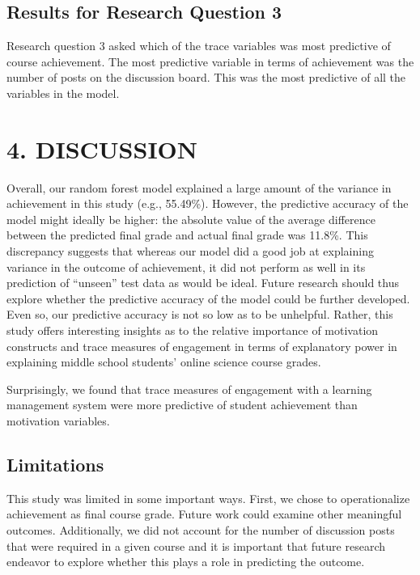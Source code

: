 \documentclass[acmart]{apa6}
\theoremstyle{definition}
\theoremstyle{definition}
\theoremstyle{definition}
\theoremstyle{remark}
\begin{document}
\subsection{Results for Research Question
3}\label{results-for-research-question-3}

Research question 3 asked which of the trace variables was most
predictive of course achievement. The most predictive variable in terms
of achievement was the number of posts on the discussion board. This was
the most predictive of all the variables in the model.

\section{4. DISCUSSION}\label{discussion}

Overall, our random forest model explained a large amount of the
variance in achievement in this study (e.g., 55.49\%). However, the
predictive accuracy of the model might ideally be higher: the absolute
value of the average difference between the predicted final grade and
actual final grade was 11.8\%. This discrepancy suggests that whereas
our model did a good job at explaining variance in the outcome of
achievement, it did not perform as well in its prediction of
\enquote{unseen} test data as would be ideal. Future research should
thus explore whether the predictive accuracy of the model could be
further developed. Even so, our predictive accuracy is not so low as to
be unhelpful. Rather, this study offers interesting insights as to the
relative importance of motivation constructs and trace measures of
engagement in terms of explanatory power in explaining middle school
students' online science course grades.

Surprisingly, we found that trace measures of engagement with a learning
management system were more predictive of student achievement than
motivation variables.

\subsection{Limitations}\label{limitations}

This study was limited in some important ways. First, we chose to
operationalize achievement as final course grade. Future work could
examine other meaningful outcomes. Additionally, we did not account for
the number of discussion posts that were required in a given course and
it is important that future research endeavor to explore whether this
plays a role in predicting the outcome.
\end{document}
